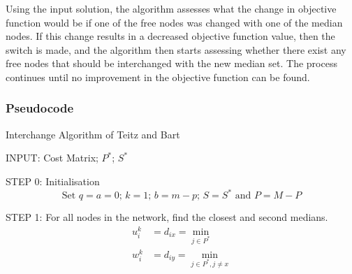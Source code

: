 \documentclass[11pt]{article}
\begin{document}
	Using the input solution, the algorithm assesses what the change in objective function would be if one of the free nodes was changed with one of the median nodes.  If this change results in a decreased objective function value, then the switch is made, and the algorithm then starts assessing whether there exist any free nodes that should be interchanged with the new median set.  The process continues until no improvement in the objective function can be found.
	
	
	\subsubsection{Pseudocode}
	\begin{algorithm}
		\caption{Interchange Algorithm of Teitz and Bart}
		\begin{algorithmic}[0]
			\Statex 
			\Statex INPUT: Cost Matrix; $P^*$; $S^*$
						
			\Statex 
			\Statex STEP 0: Initialisation 	
			\begin{equation*}
			\text{Set } q=a=0 \text{; } k=1 \text{; } b=m-p \text{; } S=S^* \text{ and } P = M - P
			\end{equation*}
			
			\Statex 
			\Statex STEP 1: For all nodes in the network, find the closest and second medians.
			\begin{align*}
			u_i^k &= d_{ix} = \min_{j\in P^*}\\
			w_i^k &= d_{iy} = \min_{j\in P^*, j\neq x}
			\end{align*} 

\Statex	
{}
\end{algorithmic}
\end{algorithm}
\end{document}
